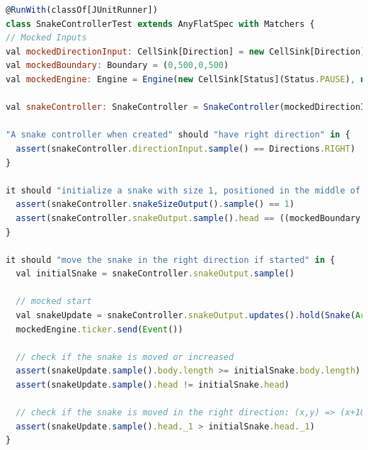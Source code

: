 \documentclass[../main.tex]{subfiles}
\begin{document}
\begin{lstlisting}[language=Javascript, caption=Esempio Test SnakeController - Unit testing codice FRP]
@RunWith(classOf[JUnitRunner])
class SnakeControllerTest extends AnyFlatSpec with Matchers {
// Mocked Inputs
val mockedDirectionInput: CellSink[Direction] = new CellSink[Direction](Directions.RIGHT)
val mockedBoundary: Boundary = (0,500,0,500)
val mockedEngine: Engine = Engine(new CellSink[Status](Status.PAUSE), new CellSink[Int](1))

val snakeController: SnakeController = SnakeController(mockedDirectionInput, mockedBoundary, mockedEngine)

"A snake controller when created" should "have right direction" in {
  assert(snakeController.directionInput.sample() == Directions.RIGHT)
}

it should "initialize a snake with size 1, positioned in the middle of the playground" in {
  assert(snakeController.snakeSizeOutput().sample() == 1)
  assert(snakeController.snakeOutput.sample().head == ((mockedBoundary._2/2).round,(mockedBoundary._4/2).round))
}

it should "move the snake in the right direction if started" in {
  val initialSnake = snakeController.snakeOutput.sample()

  // mocked start
  val snakeUpdate = snakeController.snakeOutput.updates().hold(Snake(Array((0,0))))
  mockedEngine.ticker.send(Event())

  // check if the snake is moved or increased
  assert(snakeUpdate.sample().body.length >= initialSnake.body.length)
  assert(snakeUpdate.sample().head != initialSnake.head)

  // check if the snake is moved in the right direction: (x,y) => (x+10,y)
  assert(snakeUpdate.sample().head._1 > initialSnake.head._1)
}
\end{lstlisting}
 
\end{document}
